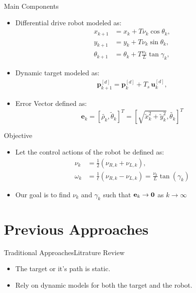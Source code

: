 \documentclass{beamer}
\begin{document}
\begin{frame}{Main Components}
\begin{itemize}
\item Differential drive robot modeled as: 
\begin{subequations}
  \label{eq:robotModelDT}  
  \begin{align}
    x_{k+1} &= x_k +T\nu_k\cos\theta_k,\\
    y_{k+1} &= y_k +T\nu_k\sin\theta_k,\\
    \theta_{k+1} &= \theta_k + T\frac{\nu_k}{L}\tan\gamma_k,
  \end{align}
\end{subequations}
\item Dynamic target modeled as: 
 \begin{align}
   \label{eq:leaderDT}
   \mathbf{p}_{k+1}^{[d]} = \mathbf{p}_k^{[d]} + T_s \, \mathbf{u}_k^{[d]},
 \end{align}
\item Error Vector defined as:\
\begin{equation}    
\mathbf{e}_k = \left[ \tilde{\rho_k},\tilde\theta_k \right]^T=\left[ \sqrt{\tilde{x}_k^2+\tilde{y}_k^2},\tilde{\theta_k} \right]^T
\end{equation} 
\end{itemize}
\end{frame}
%
\begin{frame}{Objective}
\begin{itemize}
\item Let the control actions of the robot be defined as: 
 \begin{subequations}
   \begin{align}
     \nu_{k} &= \frac{1}{2}(\nu_{R,k} + \nu_{L,k}),\\
     \omega_{k} &= \frac{1}{\ell}(\nu_{R,k} - \nu_{L,k}) = \frac{\nu_{k}}{L}\tan(\gamma_k) 	
   \end{align}
 \label{eq:robotModel1-DT}
 \end{subequations}
\item Our goal is to find $\nu_k$ and $\gamma_k$ such that ${\bf e}_k\to {\bf 0}$ as  $k\to\infty$
\end{itemize}
\end{frame}
\section{Previous Approaches}
\begin{frame}{Traditional Approaches}{Litrature Review}
\begin{itemize}
\item The target or it's path is static. 
\item Rely on dynamic models for both the target and the robot.
\end{itemize}
\end{frame}
\end{document}
